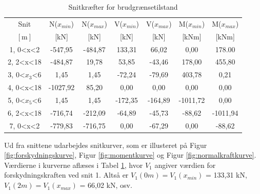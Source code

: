 \begin{table} [H]
	\begin{center}
		\begin{tabular}{c c c c c c c}
			\hline
			Snit & N($x_{min}$) & N($x_{max}$) & V($x_{min}$) & V($x_{max}$) & M($x_{min}$) & M($x_{max}$) 	\\ 
			$[\text{m}]$ & [kN] & [kN] & [kN] & [kN] & [kNm] & [kNm] \\ \hline
			1, 0<x<2  & -547,95       & -484,87    	&  133,31    	&  66,02 	&  0,00     &  178.00        		\\ 
			2, 2<x<18 &  -484,87        &  19,78       &  53,85      & -43,46   &  178,00  &  455,80    \\ 
			3, 0<$x_3$<6  & 1,45       &  1,45     &  -72,24         &  -79,69     &  403,78     &  0,21 			    \\
			4, 0<x<18 &  -1027,92       &  85,20      &  0,00        &  0,00    &  0,00   &   0,00    \\ 
			5, 0<$x_5$<6  &  1,45     &    1,45      &  -172,35      &  -164,89     &   -1011,72        &   0,00      		\\ 
			6, 2<x<18 &  -716,74  &   -212,09  &   -64,89    &   -45,73    &    -88,62       &   -1011,94      		\\ 
			7, 0<x<2 &  -779,83        &   -716,75       &     0,00      &   -67,29   &    0,00     &    -88,62     		\\ 
		\end{tabular}
		\caption{Snitkræfter for brudgrænsetilstand}
		\label{tab:resultaterbrud}
	\end{center}
\end{table}

Ud fra snittene udarbejdes snitkurver, som er illusteret på Figur \ref{fig:forskydningskurve}, Figur \ref{fig:momentkurve} og Figur \ref{fig:normalkraftkurve}. Værdierne i kurverne aflæses i Tabel \ref{tab:resultaterbrud}, hvor $V_1$ angiver værdien for forskydningskraften ved snit 1. Altså er $V_1(0m) = V_1(x_{min})$ = 133,31 kN, $V_1(2m) = V_1(x_{max})$ = 66,02 kN, osv.

